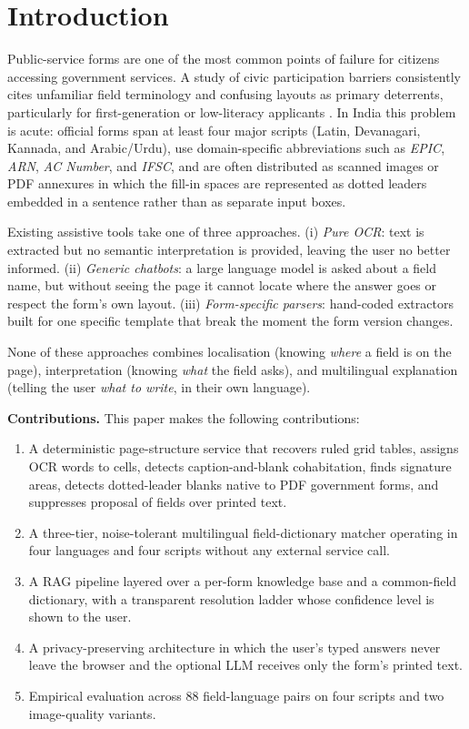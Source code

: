 \documentclass[conference]{IEEEtran}
\begin{document}
\section{Introduction}

Public-service forms are one of the most common points of failure for citizens accessing government services. A study of civic participation barriers consistently cites unfamiliar field terminology and confusing layouts as primary deterrents, particularly for first-generation or low-literacy applicants \cite{placeholder_civic}. In India this problem is acute: official forms span at least four major scripts (Latin, Devanagari, Kannada, and Arabic/Urdu), use domain-specific abbreviations such as \textit{EPIC}, \textit{ARN}, \textit{AC Number}, and \textit{IFSC}, and are often distributed as scanned images or PDF annexures in which the fill-in spaces are represented as dotted leaders embedded in a sentence rather than as separate input boxes.

Existing assistive tools take one of three approaches. (i) \textit{Pure OCR}: text is extracted but no semantic interpretation is provided, leaving the user no better informed. (ii) \textit{Generic chatbots}: a large language model is asked about a field name, but without seeing the page it cannot locate where the answer goes or respect the form's own layout. (iii) \textit{Form-specific parsers}: hand-coded extractors built for one specific template that break the moment the form version changes.

None of these approaches combines localisation (knowing \emph{where} a field is on the page), interpretation (knowing \emph{what} the field asks), and multilingual explanation (telling the user \emph{what to write}, in their own language).

\textbf{Contributions.} This paper makes the following contributions:
\begin{enumerate}
  \item A deterministic page-structure service that recovers ruled grid tables, assigns OCR words to cells, detects caption-and-blank cohabitation, finds signature areas, detects dotted-leader blanks native to PDF government forms, and suppresses proposal of fields over printed text.
  \item A three-tier, noise-tolerant multilingual field-dictionary matcher operating in four languages and four scripts without any external service call.
  \item A RAG pipeline layered over a per-form knowledge base and a common-field dictionary, with a transparent resolution ladder whose confidence level is shown to the user.
  \item A privacy-preserving architecture in which the user's typed answers never leave the browser and the optional LLM receives only the form's printed text.
  \item Empirical evaluation across 88 field-language pairs on four scripts and two image-quality variants.
\end{enumerate}
\end{document}
